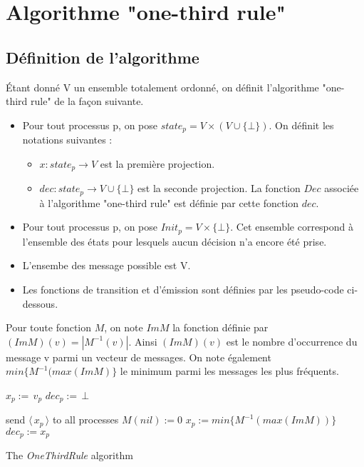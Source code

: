 \documentclass{article}
\begin{document}
\section{Algorithme "one-third rule"}
\subsection{Définition de l'algorithme}

Étant donné V un ensemble totalement ordonné, on définit l'algorithme "one-third rule" de la façon suivante.
\begin{itemize}
	\item Pour tout processus p, on pose $state_p = V \times (V \cup \{ \bot \})$.
	On définit les notations suivantes :
	\begin{itemize}

		\item $x : state_p \rightarrow V$ est la première projection.
		\item $dec : state_p \rightarrow V \cup \{\bot\}$ est la seconde projection. La fonction $Dec$ associée à l'algorithme "one-third rule" est définie par cette fonction $dec$.

	\end{itemize}
\item Pour tout processus p, on pose $Init_p = V \times \{ \bot \}$. Cet ensemble correspond à l'ensemble des états pour lesquels aucun décision n'a encore été prise.
\item L'ensembe des message possible est V. 
\item Les fonctions de transition et d'émission sont définies par les pseudo-code ci-dessous.
\end{itemize}
Pour toute fonction $M$, on note $Im M$ la fonction définie par $(Im M)(v) = |M^{-1}(v)|$. Ainsi $(Im M)(v)$ est le nombre d'occurrence du message v parmi un vecteur de messages.
On note également $min \{M^{-1} (max (Im M)\}$  le minimum parmi les messages les plus fréquents.

\begin{algorithm}[htb]
\begin{distribalgo}[1]
\BLANK {}
  \STATE $x_p :=\, v_p$ 
  \STATE $dec_p :=\, \bot$ 

\ENDINDENT \BLANK

    \STATE send $\langle\, x_p\, \rangle$ to all processes
  \ENDINDENT
  \BLANK
	\STATE $M(nil) := 0$ 
	  \STATE $x_p := min \{M^{-1} (max (Im M))\}$ 
		  \STATE $dec_p := x_p$ 
        \ENDIF
      \ENDIF
  \ENDINDENT
\ENDINDENT \BLANK


\caption{The {\em OneThirdRule} algorithm} \label{algo:R}
\end{distribalgo}

\end{algorithm}
\end{document}
